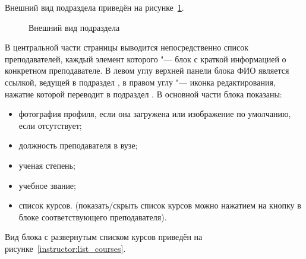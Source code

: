Внешний вид подраздела приведён на рисунке~\ref{instructor:list}. 

	\begin{figure}[H]
	\caption{Внешний вид подраздела }
	\label{instructor:list}
	\end{figure}
	
В центральной части страницы выводится непосредственно список преподавателей, каждый элемент которого "--- блок с краткой информацией о конкретном преподавателе. В левом углу верхней панели блока ФИО является ссылкой, ведущей в подраздел , в правом углу "--- иконка редактирования, нажатие которой переводит в подраздел . В основной части блока показаны:
\begin{itemize}
	\item фотография профиля, если она загружена или изображение по умолчанию, если отсутствует;
	\item должность преподавателя в вузе;
	\item ученая степень;
	\item учебное звание;
	\item список курсов. (показать/скрыть список курсов можно нажатием на кнопку  в блоке соответствующего преподавателя).
\end{itemize}

Вид блока с развернутым списком курсов приведён на рисунке~\ref{instructor:list_courses}.
	

